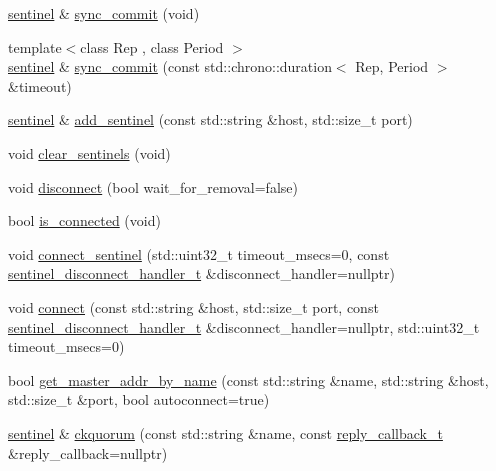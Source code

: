 \begin{DoxyCompactItemize}
\item 
\hyperlink{classcpp__redis_1_1sentinel}{sentinel} \& \hyperlink{classcpp__redis_1_1sentinel_a8e4d231ac89510c337fe97fe9e642785}{sync\+\_\+commit} (void)
\item 
{\footnotesize template$<$class Rep , class Period $>$ }\\\hyperlink{classcpp__redis_1_1sentinel}{sentinel} \& \hyperlink{classcpp__redis_1_1sentinel_afbaa0b80266f70ad98c0bf8f28c533ab}{sync\+\_\+commit} (const std\+::chrono\+::duration$<$ Rep, Period $>$ \&timeout)
\item 
\hyperlink{classcpp__redis_1_1sentinel}{sentinel} \& \hyperlink{classcpp__redis_1_1sentinel_a548dad45711dc2e7da7e0803d5a74a2e}{add\+\_\+sentinel} (const std\+::string \&host, std\+::size\+\_\+t port)
\item 
void \hyperlink{classcpp__redis_1_1sentinel_ac36640b3f392970c72f5a513a2d61ac7}{clear\+\_\+sentinels} (void)
\item 
void \hyperlink{classcpp__redis_1_1sentinel_af607d8c5a20ada35daad251f1b1b2f68}{disconnect} (bool wait\+\_\+for\+\_\+removal=false)
\item 
bool \hyperlink{classcpp__redis_1_1sentinel_aa98a0593e6e7c04d8d0dd1f292cdce47}{is\+\_\+connected} (void)
\item 
void \hyperlink{classcpp__redis_1_1sentinel_ad10e26012984341c82dd4c6a7ef2253b}{connect\+\_\+sentinel} (std\+::uint32\+\_\+t timeout\+\_\+msecs=0, const \hyperlink{classcpp__redis_1_1sentinel_a923e06b5b700c16dffec8a01d2fa9aa4}{sentinel\+\_\+disconnect\+\_\+handler\+\_\+t} \&disconnect\+\_\+handler=nullptr)
\item 
void \hyperlink{classcpp__redis_1_1sentinel_a1dfba8240daf7cfa7502f57957cffbda}{connect} (const std\+::string \&host, std\+::size\+\_\+t port, const \hyperlink{classcpp__redis_1_1sentinel_a923e06b5b700c16dffec8a01d2fa9aa4}{sentinel\+\_\+disconnect\+\_\+handler\+\_\+t} \&disconnect\+\_\+handler=nullptr, std\+::uint32\+\_\+t timeout\+\_\+msecs=0)
\item 
bool \hyperlink{classcpp__redis_1_1sentinel_a2886493b40b00dfafdd3b22dfe28e0c3}{get\+\_\+master\+\_\+addr\+\_\+by\+\_\+name} (const std\+::string \&name, std\+::string \&host, std\+::size\+\_\+t \&port, bool autoconnect=true)
\item 
\hyperlink{classcpp__redis_1_1sentinel}{sentinel} \& \hyperlink{classcpp__redis_1_1sentinel_aaed03955e468d9f7c3df37376ecafc3a}{ckquorum} (const std\+::string \&name, const \hyperlink{classcpp__redis_1_1sentinel_ae1a150ff8787208c47414397a061c9a7}{reply\+\_\+callback\+\_\+t} \&reply\+\_\+callback=nullptr)

\end{DoxyCompactItemize}
